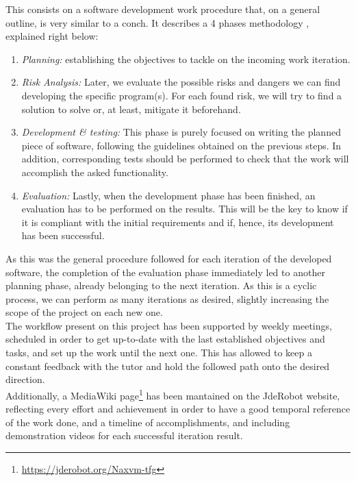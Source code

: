 This consists on a software development work procedure that, on a general outline, is very similar to a conch. It describes a 4 phases methodology \cite{spiral-steps}, explained right below:

\begin{enumerate}
	\item \textit{Planning:} establishing the objectives to tackle on the incoming work iteration.

	\item \textit{Risk Analysis:} Later, we evaluate the possible risks and dangers we can find developing the specific program(s). For each found risk, we will try to find a solution to solve or, at least, mitigate it beforehand.

	\item \textit{Development \& testing:} This phase is purely focused on writing the planned piece of software, following the guidelines obtained on the previous steps. In addition, corresponding tests should be performed to check that the work will accomplish the asked functionality.
	\item \textit{Evaluation:} Lastly, when the development phase has been finished, an evaluation has to be performed on the results. This will be the key to know if it is compliant with the initial requirements and if, hence, its development has been successful.
\end{enumerate}

As this was the general procedure followed for each iteration of the developed software, the completion of the evaluation phase immediately led to another planning phase, already belonging to the next iteration. As this is a cyclic process, we can perform as many iterations as desired, slightly increasing the scope of the project on each new one.\\

The workflow present on this project has been supported by weekly meetings, scheduled in order to get up-to-date with the last established objectives and tasks, and set up the work until the next one. This has allowed to keep a constant feedback with the tutor and hold the followed path onto the desired direction.\\

Additionally, a MediaWiki page\footnote{\url{https://jderobot.org/Naxvm-tfg}} has been mantained on the JdeRobot website, reflecting every effort and achievement in order to have a good temporal reference of the work done, and a timeline of accomplishments, and including demonstration videos for each successful iteration result.\\

